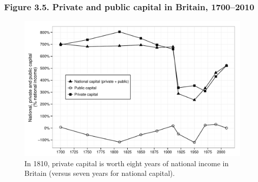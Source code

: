 \documentclass[t]{beamer}\usepackage[]{graphicx}\usepackage[]{color}
\newenvironment{knitrout}{}{} %
\begin{document}
\begin{frame}[label=Figure_3_5]
\frametitle{Figure 3.5. Private and public capital in Britain, 1700--2010}
\begin{figure}[t]
\begin{minipage}[b]{\textwidth}
\centering
\begin{knitrout}\footnotesize
{}\color{fgcolor}

{\centering \includegraphics[width=1\linewidth]{figures/bw/Figure_3_5} 

}



\end{knitrout}
\caption{In 1810, private capital is worth eight years of national income in Britain (versus seven years for national capital).}
\end{minipage}
\end{figure}
\end{frame}
\end{document}
